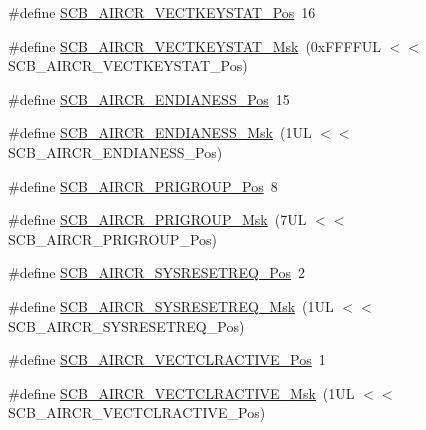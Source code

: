 \begin{DoxyCompactItemize}
\item 
\#define \mbox{\hyperlink{group___c_m_s_i_s___s_c_b_gaec404750ff5ca07f499a3c06b62051ef}{S\+C\+B\+\_\+\+A\+I\+R\+C\+R\+\_\+\+V\+E\+C\+T\+K\+E\+Y\+S\+T\+A\+T\+\_\+\+Pos}}~16
\item 
\#define \mbox{\hyperlink{group___c_m_s_i_s___s_c_b_gabacedaefeefc73d666bbe59ece904493}{S\+C\+B\+\_\+\+A\+I\+R\+C\+R\+\_\+\+V\+E\+C\+T\+K\+E\+Y\+S\+T\+A\+T\+\_\+\+Msk}}~(0x\+F\+F\+F\+F\+U\+L $<$$<$ S\+C\+B\+\_\+\+A\+I\+R\+C\+R\+\_\+\+V\+E\+C\+T\+K\+E\+Y\+S\+T\+A\+T\+\_\+\+Pos)
\item 
\#define \mbox{\hyperlink{group___c_m_s_i_s___s_c_b_gad31dec98fbc0d33ace63cb1f1a927923}{S\+C\+B\+\_\+\+A\+I\+R\+C\+R\+\_\+\+E\+N\+D\+I\+A\+N\+E\+S\+S\+\_\+\+Pos}}~15
\item 
\#define \mbox{\hyperlink{group___c_m_s_i_s___s_c_b_ga2f571f93d3d4a6eac9a3040756d3d951}{S\+C\+B\+\_\+\+A\+I\+R\+C\+R\+\_\+\+E\+N\+D\+I\+A\+N\+E\+S\+S\+\_\+\+Msk}}~(1\+U\+L $<$$<$ S\+C\+B\+\_\+\+A\+I\+R\+C\+R\+\_\+\+E\+N\+D\+I\+A\+N\+E\+S\+S\+\_\+\+Pos)
\item 
\#define \mbox{\hyperlink{group___c_m_s_i_s___s_c_b_gaca155deccdeca0f2c76b8100d24196c8}{S\+C\+B\+\_\+\+A\+I\+R\+C\+R\+\_\+\+P\+R\+I\+G\+R\+O\+U\+P\+\_\+\+Pos}}~8
\item 
\#define \mbox{\hyperlink{group___c_m_s_i_s___s_c_b_ga8be60fff03f48d0d345868060dc6dae7}{S\+C\+B\+\_\+\+A\+I\+R\+C\+R\+\_\+\+P\+R\+I\+G\+R\+O\+U\+P\+\_\+\+Msk}}~(7\+U\+L $<$$<$ S\+C\+B\+\_\+\+A\+I\+R\+C\+R\+\_\+\+P\+R\+I\+G\+R\+O\+U\+P\+\_\+\+Pos)
\item 
\#define \mbox{\hyperlink{group___c_m_s_i_s___s_c_b_gaffb2737eca1eac0fc1c282a76a40953c}{S\+C\+B\+\_\+\+A\+I\+R\+C\+R\+\_\+\+S\+Y\+S\+R\+E\+S\+E\+T\+R\+E\+Q\+\_\+\+Pos}}~2
\item 
\#define \mbox{\hyperlink{group___c_m_s_i_s___s_c_b_gaae1181119559a5bd36e62afa373fa720}{S\+C\+B\+\_\+\+A\+I\+R\+C\+R\+\_\+\+S\+Y\+S\+R\+E\+S\+E\+T\+R\+E\+Q\+\_\+\+Msk}}~(1\+U\+L $<$$<$ S\+C\+B\+\_\+\+A\+I\+R\+C\+R\+\_\+\+S\+Y\+S\+R\+E\+S\+E\+T\+R\+E\+Q\+\_\+\+Pos)
\item 
\#define \mbox{\hyperlink{group___c_m_s_i_s___s_c_b_gaa30a12e892bb696e61626d71359a9029}{S\+C\+B\+\_\+\+A\+I\+R\+C\+R\+\_\+\+V\+E\+C\+T\+C\+L\+R\+A\+C\+T\+I\+V\+E\+\_\+\+Pos}}~1
\item 
\#define \mbox{\hyperlink{group___c_m_s_i_s___s_c_b_ga212c5ab1c1c82c807d30d2307aa8d218}{S\+C\+B\+\_\+\+A\+I\+R\+C\+R\+\_\+\+V\+E\+C\+T\+C\+L\+R\+A\+C\+T\+I\+V\+E\+\_\+\+Msk}}~(1\+U\+L $<$$<$ S\+C\+B\+\_\+\+A\+I\+R\+C\+R\+\_\+\+V\+E\+C\+T\+C\+L\+R\+A\+C\+T\+I\+V\+E\+\_\+\+Pos)
$$
\end{DoxyCompactItemize}
